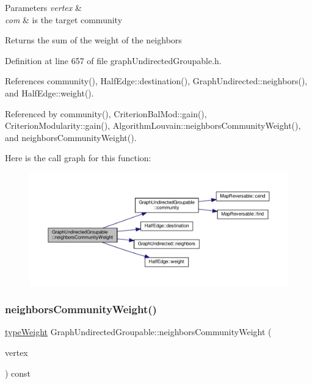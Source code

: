 \begin{DoxyParams}{Parameters}
{\em vertex} & \\
\hline
{\em com} & is the target community \\
\hline
\end{DoxyParams}
\begin{DoxyReturn}{Returns}
the sum of the weight of the neighbors 
\end{DoxyReturn}


Definition at line 657 of file graph\+Undirected\+Groupable.\+h.



References community(), Half\+Edge\+::destination(), Graph\+Undirected\+::neighbors(), and Half\+Edge\+::weight().



Referenced by community(), Criterion\+Bal\+Mod\+::gain(), Criterion\+Modularity\+::gain(), Algorithm\+Louvain\+::neighbors\+Community\+Weight(), and neighbors\+Community\+Weight().

Here is the call graph for this function\+:
\nopagebreak
\begin{figure}[H]
\begin{center}
\leavevmode
\includegraphics[width=350pt]{classGraphUndirectedGroupable_a24c1e8303eefff2635f7462d3cf1c6cf_cgraph}
\end{center}
\end{figure}
\mbox{\label{classGraphUndirectedGroupable_ae11062420fb89f450762eb3456b18f8f}} 
\subsubsection{\texorpdfstring{neighbors\+Community\+Weight()}{neighborsCommunityWeight()}\hspace{0.1cm}{\footnotesize\ttfamily [2/2]}}
{\footnotesize\ttfamily \hyperlink{edge_8h_a2e7ea3be891ac8b52f749ec73fee6dd2}{type\+Weight} Graph\+Undirected\+Groupable\+::neighbors\+Community\+Weight (\begin{DoxyParamCaption}\item[{const \hyperlink{edge_8h_a5fbd20c46956d479cb10afc9855223f6}{type\+Vertex} \&}]{vertex }\end{DoxyParamCaption}) const\hspace{0.3cm}{\ttfamily [inline]}}


